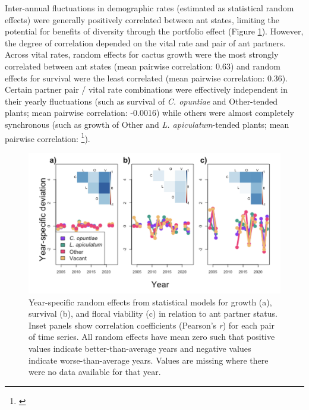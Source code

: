 \documentclass[11pt]{article}
\newcommand{\tom}[2]{{\color{red}{#1}}\footnote{\textit{\color{red}{#2}}}}
\begin{document}

Inter-annual fluctuations in demographic rates (estimated as statistical random effects) were generally positively correlated between ant states, limiting the potential for benefits of diversity through the portfolio effect (Figure \ref{fig:Annual_Ant}).
However, the degree of correlation depended on the vital rate and pair of ant partners. 
Across vital rates, random effects for cactus growth were the most strongly correlated between ant states (mean pairwise correlation: 0.63) and random effects for survival were the least correlated (mean pairwise correlation: 0.36).  
Certain partner pair / vital rate combinations were effectively independent in their yearly fluctuations (such as survival of \textit{C. opuntiae} and Other-tended plants; mean pairwise correlation: -0.0016) while others were almost completely synchronous (such as growth of Other and \textit{L. apiculatum}-tended plants; mean pairwise correlation: \tom{0.093}{SHould this be 0.93?}). 

\begin{figure}[H]
	\includegraphics[width=0.75\linewidth]{Figures/ant_RFX.png}
	\caption{Year-specific random effects from statistical models for growth (a), survival (b), and floral viability (c) in relation to ant partner status. Inset panels show correlation coefficients (Pearson's \textit{r}) for each pair of time series. All random effects have mean zero such that positive values indicate better-than-average years and negative values indicate worse-than-average years. Values are missing where there were no data available for that year.}
	\label{fig:Annual_Ant}
\end{figure}
\end{document}
